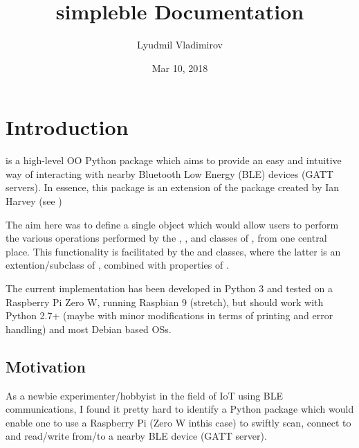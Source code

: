 \documentclass[letterpaper,10pt,english]{sphinxmanual}
\title{simpleble Documentation}
\date{Mar 10, 2018}
\author{Lyudmil Vladimirov}
\begin{document}
\maketitle
\sphinxtableofcontents
{}\label{\detokenize{index::doc}}



\chapter{Introduction}
\label{\detokenize{intro:welcome-to-simpleble-s-documentation}}\label{\detokenize{intro:introduction}}\label{\detokenize{intro::doc}}
 is a high-level OO Python package which aims to provide an easy and intuitive way of interacting with nearby Bluetooth Low Energy (BLE) devices (GATT servers). In essence, this package is an extension of the  package created by Ian Harvey (see )

The aim here was to define a single object which would allow users to perform the various operations performed by the , ,  and  classes of , from one central place. This functionality is facilitated by the  and  classes, where the latter is an extention/subclass of , combined with properties of .

The current implementation has been developed in Python 3 and tested on a Raspberry Pi Zero W, running Raspbian 9 (stretch), but should work with Python 2.7+ (maybe with minor modifications in terms of printing and error handling) and most Debian based OSs.


\section{Motivation}
\label{\detokenize{intro:motivation}}
As a newbie experimenter/hobbyist in the field of IoT using BLE communications, I found it pretty hard to identify a Python package which would enable one to use a Raspberry Pi (Zero W inthis case) to swiftly scan, connect to and read/write from/to a nearby BLE device (GATT server).
\end{document}
